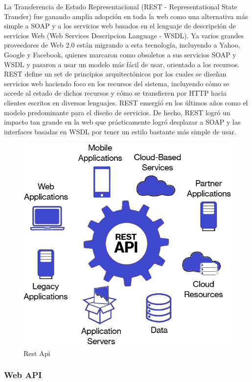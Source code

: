 		{La Transferencia de Estado Representacional (REST - Representational State Transfer) fue ganando amplia adopción en toda la web como una alternativa más simple a SOAP y a los servicios web basados en el lenguaje de descripción de servicios Web (Web Services Descripcion Language - WSDL). Ya varios grandes proveedores de Web 2.0 están migrando a esta tecnología, incluyendo a Yahoo, Google y Facebook, quienes marcaron como obsoletos a sus servicios SOAP y WSDL y pasaron a usar un modelo más fácil de usar, orientado a los recursos.\\
			
		REST define un set de principios arquitectónicos por los cuales se diseñan servicios web haciendo foco en los recursos del sistema, incluyendo cómo se accede al estado de dichos recursos y cómo se transfieren por HTTP hacia clientes escritos en diversos lenguajes. REST emergió en los últimos años como el modelo predominante para el diseño de servicios. De hecho, REST logró un impacto tan grande en la web que prácticamente logró desplazar a SOAP y las interfaces basadas en WSDL por tener un estilo bastante más simple de usar. \cite{restful}
		
		\begin{figure}[H]
			\centering
			\includegraphics[width=0.6\linewidth]{description/framework/restful.png}
			\caption{Rest Api}
		\end{figure}
		}
	
	
		\subsubsection{Web API}
		
